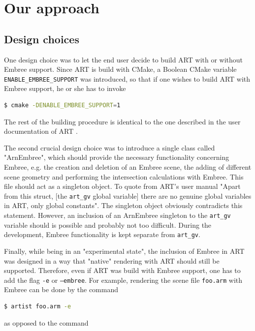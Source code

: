 \chapter{Our approach}
\label{chap:math}

\section{Design choices}
One design choice was to let the end user decide to build ART with or without Embree support. Since ART is build with CMake, a Boolean CMake variable \texttt{ENABLE\_EMBREE\_SUPPORT} was introduced, so that if one wishes to build ART with Embree support, he or she has to invoke 

\begin{lstlisting}[language=bash]
$ cmake -DENABLE_EMBREE_SUPPORT=1 
\end{lstlisting}

The rest of the building procedure is identical to the one described in the user documentation of ART \cite{arthandbook}.

The second crucial design choice was to introduce a single class called "ArnEmbree", which should provide the necessary functionality concerning Embree, e.g. the creation and deletion of an Embree scene, the adding of different scene geometry and performing the intersection calculations with Embree. This file should act as a singleton object. To quote from ART's user manual \cite[Chapter 4.1.2]{arthandbook} "Apart from this struct, [the \texttt{art\_gv} global variable] there are no genuine global variables in ART, only global constants". The singleton object obviously contradicts this statement. However, an inclusion of an ArnEmbree singleton to the \texttt{art\_gv} variable should is possible and probably not too difficult. During the development, Embree functionality is kept separate from \texttt{art\_gv}.

Finally, while being in an "experimental state", the inclusion of Embree in ART was designed in a way that "native" rendering with ART should still be supported. Therefore, even if ART was build with Embree support, one has to add the flag \texttt{-e} or \texttt{--embree}. For example, rendering the scene file \texttt{foo.arm} with Embree can be done by the command 

\begin{lstlisting}[language=bash]
$ artist foo.arm -e 
\end{lstlisting}

as opposed to the command


